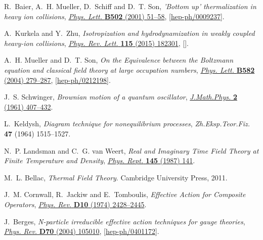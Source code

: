 \documentclass[onecolumn,showpacs,nobibnotes,nofootinbib,12pt,aps,prd,showpacs,notitlepage,nofootinbib,preprintnumbers,amsmath,amssymb]{article}
\begin{document}
\begin{thebibliography}{10}
R.~Baier, A.~H. Mueller, D.~Schiff and D.~T. Son, \emph{{'Bottom up'
  thermalization in heavy ion collisions}},
  \href{https://doi.org/10.1016/S0370-2693(01)00191-5}{\emph{Phys. Lett.}
  {\bfseries B502} (2001) 51--58},
  [\href{https://arxiv.org/abs/hep-ph/0009237}{{\ttfamily hep-ph/0009237}}].

A.~Kurkela and Y.~Zhu, \emph{{Isotropization and hydrodynamization in weakly
  coupled heavy-ion collisions}},
  \href{https://doi.org/10.1103/PhysRevLett.115.182301}{\emph{Phys. Rev. Lett.}
  {\bfseries 115} (2015) 182301},
  [\href{https://arxiv.org/abs/1506.06647}{{}}].

A.~H. Mueller and D.~T. Son, \emph{{On the Equivalence between the Boltzmann
  equation and classical field theory at large occupation numbers}},
  \href{https://doi.org/10.1016/j.physletb.2003.12.047}{\emph{Phys. Lett.}
  {\bfseries B582} (2004) 279--287},
  [\href{https://arxiv.org/abs/hep-ph/0212198}{{\ttfamily hep-ph/0212198}}].

J.~S. Schwinger, \emph{{Brownian motion of a quantum oscillator}},
  \href{https://doi.org/10.1063/1.1703727}{\emph{J.Math.Phys.} {\bfseries 2}
  (1961) 407--432}.

L.~Keldysh, \emph{{Diagram technique for nonequilibrium processes}},
  {\emph{Zh.Eksp.Teor.Fiz.} {\bfseries 47} (1964) 1515--1527}.

N.~P. Landsman and C.~G. van Weert, \emph{{Real and Imaginary Time Field Theory
  at Finite Temperature and Density}},
  \href{https://doi.org/10.1016/0370-1573(87)90121-9}{\emph{Phys. Rept.}
  {\bfseries 145} (1987) 141}.

M.~L. Bellac, \emph{{Thermal Field Theory}}.
\newblock Cambridge University Press, 2011.

J.~M. Cornwall, R.~Jackiw and E.~Tomboulis, \emph{{Effective Action for
  Composite Operators}},
  \href{https://doi.org/10.1103/PhysRevD.10.2428}{\emph{Phys. Rev.} {\bfseries
  D10} (1974) 2428--2445}.

J.~Berges, \emph{{N-particle irreducible effective action techniques for gauge
  theories}}, \href{https://doi.org/10.1103/PhysRevD.70.105010}{\emph{Phys.
  Rev.} {\bfseries D70} (2004) 105010},
  [\href{https://arxiv.org/abs/hep-ph/0401172}{{\ttfamily hep-ph/0401172}}].


\end{thebibliography}
\end{document}
